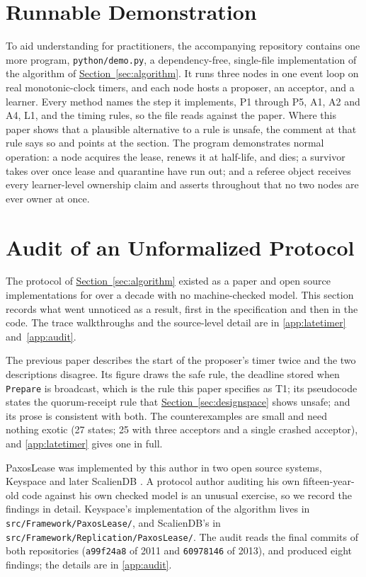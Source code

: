 \documentclass[final,5p,times,twocolumn,number]{elsarticle}
\newcommand{\code}[1]{\texttt{#1}}
\newcommand{\secref}[1]{\hyperref[#1]{Section~\ref*{#1}}}
\begin{document}
\section{Runnable Demonstration}\label{sec:demo}

To aid understanding for practitioners, the accompanying repository contains one more program, \code{python/demo.py}, a dependency-free, single-file implementation of the algorithm of \secref{sec:algorithm}.  It runs three nodes in one event loop on real monotonic-clock timers, and each node hosts a proposer, an acceptor, and a learner.  Every method names the step it implements, P1 through P5, A1, A2 and A4, L1, and the timing rules, so the file reads against the paper.  Where this paper shows that a plausible alternative to a rule is unsafe, the comment at that rule says so and points at the section.  The program demonstrates normal operation: a node acquires the lease, renews it at half-life, and dies; a survivor takes over once lease and quarantine have run out; and a referee object receives every learner-level ownership claim and asserts throughout that no two nodes are ever owner at once.

\section{Audit of an Unformalized Protocol}\label{sec:audit}

The protocol of \secref{sec:algorithm} existed as a paper and open source implementations for over a decade with no machine-checked model.  This section records what went unnoticed as a result, first in the specification and then in the code.  The trace walkthroughs and the source-level detail are in \ref{app:latetimer} and~\ref{app:audit}.

The previous paper describes the start of the proposer's timer twice and the two descriptions disagree.  Its figure draws the safe rule, the deadline stored when \code{Prepare} is broadcast, which is the rule this paper specifies as T1; its pseudocode states the quorum-receipt rule that \secref{sec:designspace} shows unsafe; and its prose is consistent with both.  The counterexamples are small and need nothing exotic (27 states; 25 with three acceptors and a single crashed acceptor), and \ref{app:latetimer} gives one in full.

PaxosLease was implemented by this author in two open source systems, Keyspace \cite{ref14} and later ScalienDB \cite{ref15}.  A protocol author auditing his own fifteen-year-old code against his own checked model is an unusual exercise, so we record the findings in detail.  Keyspace's implementation of the algorithm lives in \code{src/Framework/PaxosLease/}, and ScalienDB's in \code{src/Framework/Replication/PaxosLease/}.  The audit reads the final commits of both repositories (\code{a99f24a8} of 2011 and \code{60978146} of 2013), and produced eight findings; the details are in \ref{app:audit}.
\end{document}
